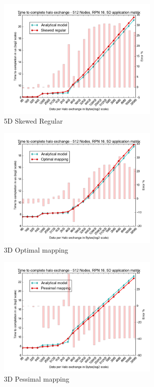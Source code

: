 \documentclass{beamer}
\begin{document}
\begin{frame}
\begin{figure}
\caption{5D Skewed Regular}
\includegraphics[width=0.7\textwidth]{../mappings/5d_skewed_regular.png}
\end{figure}
\end{frame}

\begin{frame}
\begin{figure}
\caption{3D Optimal mapping}
  \includegraphics[width=0.7\textwidth]{../mappings/3d_optimal.png}
\end{figure}
\end{frame}

\begin{frame}
\begin{figure}
\caption{3D Pessimal mapping}
  \includegraphics[width=0.7\textwidth]{../mappings/3d_pessimal.png}
\end{figure}
\end{frame}
\end{document}
